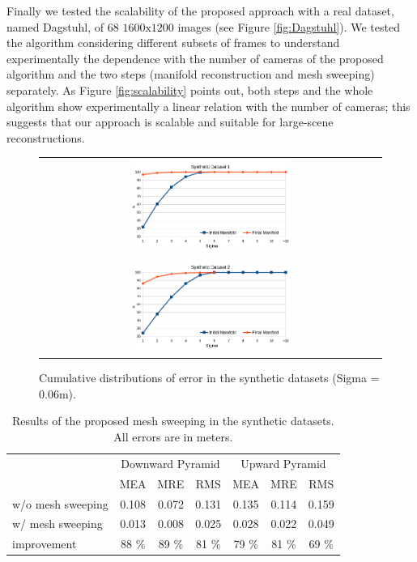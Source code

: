 Finally we tested the scalability of the proposed approach with a real dataset, named Dagstuhl, of 68 $1600\text{x}1200$ images (see Figure \ref{fig:Dagstuhl}). 
We tested the algorithm considering different subsets of frames to understand experimentally the dependence with the number of cameras of the proposed algorithm and the two steps (manifold reconstruction and mesh sweeping) separately. 
As Figure \ref{fig:scalability} points out, both steps and the whole algorithm show experimentally a linear relation with the number of cameras; this suggests that our approach is scalable and suitable for large-scene reconstructions.



\begin{figure}[t]
\setlength{\tabcolsep}{1px}
\centering
\begin{tabular}{c}
\includegraphics[width=0.48\textwidth]{./img/histSim1}\\
\includegraphics[width=0.48\textwidth]{./img/histSim2}\\
\end{tabular}
\caption{Cumulative distributions of error in the synthetic datasets (Sigma = 0.06m).}
\label{fig:simulatedhist}
\end{figure}

\begin{table}[t]
\caption{Results of the proposed mesh sweeping in the synthetic datasets. All errors are in meters.}
\label{tab:resSim}
\scriptsize
\centering
\begin{tabular}{lcccccc}
\toprule 
&\multicolumn{3}{c}{Downward Pyramid}&\multicolumn{3}{c}{Upward Pyramid}\\
              & MEA & MRE & RMS  &  MEA& MRE & RMS  \\
\midrule
w/o mesh sweeping  & 0.108 & 0.072 & 0.131 &  0.135 & 0.114 & 0.159 \\
w/ mesh sweeping    & 0.013 & 0.008 & 0.025 &  0.028 & 0.022 & 0.049 \\
improvement   & 88 \% & 89 \% & 81 \% &  79 \% & 81 \% & 69 \% \\
\end{tabular}
\end{table}


